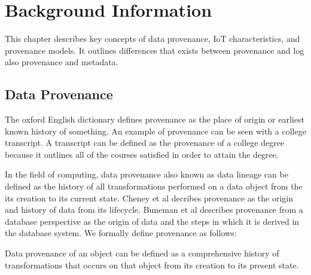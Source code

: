 \chapter{Background Information}

This chapter describes key concepts of data provenance, IoT characteristics, and provenance models. It outlines differences that exists between provenance and log also provenance and metadata. 

\section{Data Provenance}
The oxford English dictionary defines provenance as the place of origin or earliest known history of something.  An example of provenance can be seen with a college transcript. A transcript can be defined as the provenance of a college degree because it outlines all of the courses satisfied in order to attain the degree.
\par In the field of computing, data provenance also known as  data lineage can be defined as the history of all transformations performed on a data object from the its creation to its current state. Cheney et al \cite{cheney_provenance_2009} decribes provenance as the origin and history of data from its lifecycle. Buneman et al \cite{buneman_why_2001} describes provenance from a database perspective as the origin of data and the steps in which it is derived in the database system.  We formally define provenance as follows:


\begin{definition}

Data provenance of an object can be defined as a comprehensive history of transformations that occurs on that object from its creation to its present state.

\end{definition}

